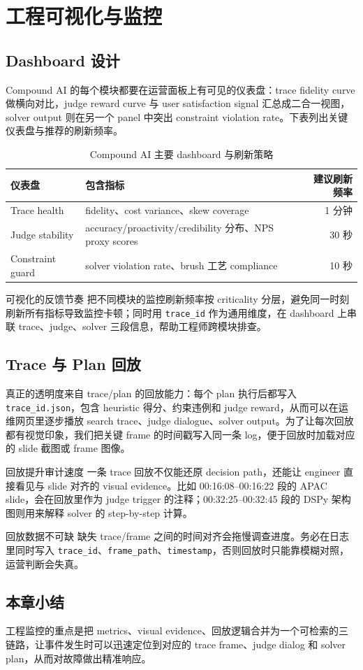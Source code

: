 \section{工程可视化与监控}

\subsection{Dashboard 设计}
Compound AI 的每个模块都要在运营面板上有可见的仪表盘：trace fidelity curve 做横向对比，judge reward curve 与 user satisfaction signal 汇总成二合一视图，solver output 则在另一个 panel 中突出 constraint violation rate。下表列出关键仪表盘与推荐的刷新频率。
\begin{table}[H]
\centering
\begin{tabular}{lp{8cm}r}
\toprule
仪表盘 & 包含指标 & 建议刷新频率 \\
\midrule
Trace health & fidelity、cost variance、skew coverage & 1 分钟 \\
Judge stability & accuracy/proactivity/credibility 分布、NPS proxy scores & 30 秒 \\
Constraint guard & solver violation rate、brush 工艺 compliance & 10 秒 \\
\bottomrule
\end{tabular}
\caption{Compound AI 主要 dashboard 与刷新策略}
\end{table}
\begin{knowledgebox}{可视化的反馈节奏}
把不同模块的监控刷新频率按 criticality 分层，避免同一时刻刷新所有指标导致监控卡顿；同时用 \texttt{trace\_id} 作为通用维度，在 dashboard 上串联 trace、judge、solver 三段信息，帮助工程师跨模块排查。
\end{knowledgebox}

\subsection{Trace 与 Plan 回放}
真正的透明度来自 trace/plan 的回放能力：每个 plan 执行后都写入 \texttt{trace\_id.json}，包含 heuristic 得分、约束违例和 judge reward，从而可以在运维网页里逐步播放 search trace、judge dialogue、solver output。为了让每次回放都有视觉印象，我们把关键 frame 的时间戳写入同一条 log，便于回放时加载对应的 slide 截图或 frame 图像。
\begin{knowledgebox}{回放提升审计速度}
一条 trace 回放不仅能还原 decision path，还能让 engineer 直接看见与 slide 对齐的 visual evidence。比如 00:16:08--00:16:22 段的 APAC slide，会在回放里作为 judge trigger 的注释；00:32:25--00:32:45 段的 DSPy 架构图则用来解释 solver 的 step-by-step 计算。
\end{knowledgebox}
\begin{warningbox}{回放数据不可缺}
缺失 trace/frame 之间的时间对齐会拖慢调查进度。务必在日志里同时写入 \texttt{trace\_id}、\texttt{frame\_path}、\texttt{timestamp}，否则回放时只能靠模糊对照，运营判断会失真。
\end{warningbox}

\subsection{本章小结}
工程监控的重点是把 metrics、visual evidence、回放逻辑合并为一个可检索的三链路，让事件发生时可以迅速定位到对应的 trace frame、judge dialog 和 solver plan，从而对故障做出精准响应。

